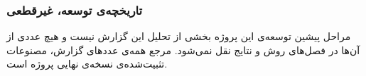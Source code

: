 \subsubsection{تاریخچه‌ی توسعه، غیرقطعی}

مراحل پیشین توسعه‌ی این پروژه بخشی از تحلیل این گزارش نیست و هیچ عددی از آن‌ها در فصل‌های روش و نتایج نقل نمی‌شود. مرجع همه‌ی عددهای گزارش، مصنوعات تثبیت‌شده‌ی نسخه‌ی نهایی پروژه است.
